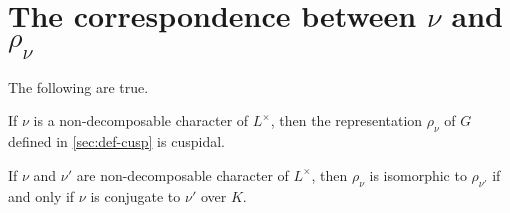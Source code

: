 \documentclass[../main.tex]{subfiles}
\begin{document}
\section{The correspondence between \texorpdfstring{$\nu$}{ v} and \texorpdfstring{$\rho_\nu$}{ pv}} \label{sec:classify-cusp}
\begin{proposition} \label{prop:cusp-reps}
	The following are true.
	\begin{listalph}
		\item If $\nu$ is a non-decomposable character of $L^\times$, then the representation $\rho_\nu$ of $G$ defined in \cref{sec:def-cusp} is cuspidal.
		\item If $\nu$ and $\nu'$ are non-decomposable character of $L^\times$, then $\rho_\nu$ is isomorphic to $\rho_{\nu'}$ if and only if $\nu$ is conjugate to $\nu'$ over $K$.
	\end{listalph}
\end{proposition}
\end{document}
